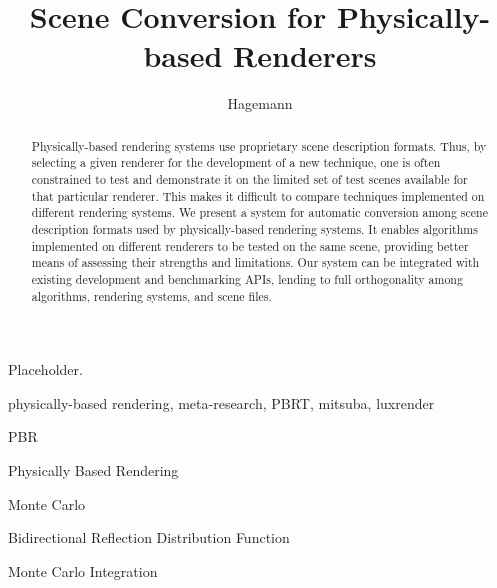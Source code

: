 \documentclass[cic,tc,english]{iiufrgs}
\title{Scene Conversion for Physically-based Renderers}
\author{Hagemann}{Luiza de Azambuja}
\begin{document}
\maketitle




\begin{abstract}
    Physically-based rendering systems use proprietary scene description formats. Thus, by selecting a given renderer for the development of a new technique, one is often constrained to test and demonstrate it on the limited set of test scenes available for that particular renderer. This makes it difficult to compare techniques implemented on different rendering systems. 
We present a system for automatic conversion among scene description formats used by physically-based rendering systems. 
It enables algorithms implemented on different renderers to be tested on the same scene, providing better means of assessing their strengths and limitations. 
Our system can be integrated with existing development and benchmarking APIs, lending to full orthogonality among algorithms, rendering systems, and scene files.
\end{abstract}

\begin{englishabstract}
    Placeholder.
\end{englishabstract}{physically-based rendering, meta-research, PBRT, mitsuba, luxrender}

\listoffigures


\begin{listofabbrv}{PBR}
    \item[PBR] Physically Based Rendering
    \item[MC] Monte Carlo
    \item[BRDF] Bidirectional Reflection Distribution Function
    \item[MCI] Monte Carlo Integration
\end{listofabbrv}
\end{document}
